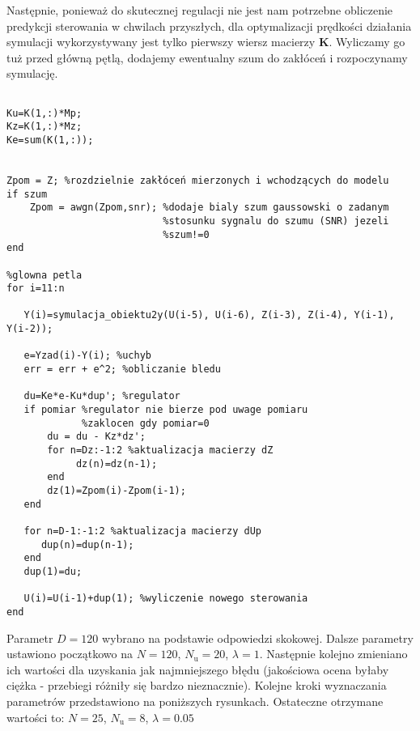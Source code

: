 Następnie, ponieważ do skutecznej regulacji nie jest nam potrzebne obliczenie predykcji sterowania w chwilach przyszłych, dla optymalizacji prędkości działania symulacji wykorzystywany jest tylko pierwszy wiersz macierzy $ \boldsymbol{K} $. Wyliczamy go tuż przed główną pętlą, dodajemy ewentualny szum do zakłóceń i rozpoczynamy symulację.


\begin{lstlisting}[style=Matlab-editor]
%przeksztalcanie wyliczonych macierzy do potrzebnych nam parametrow

Ku=K(1,:)*Mp;
Kz=K(1,:)*Mz;
Ke=sum(K(1,:));


Zpom = Z; %rozdzielnie zakłóceń mierzonych i wchodzących do modelu
if szum
    Zpom = awgn(Zpom,snr); %dodaje bialy szum gaussowski o zadanym
                           %stosunku sygnalu do szumu (SNR) jezeli 
                           %szum!=0
end

%glowna petla
for i=11:n

   Y(i)=symulacja_obiektu2y(U(i-5), U(i-6), Z(i-3), Z(i-4), Y(i-1), Y(i-2));

   e=Yzad(i)-Y(i); %uchyb
   err = err + e^2; %obliczanie bledu

   du=Ke*e-Ku*dup'; %regulator
   if pomiar %regulator nie bierze pod uwage pomiaru 
   			 %zaklocen gdy pomiar=0
       du = du - Kz*dz';
       for n=Dz:-1:2 %aktualizacja macierzy dZ
       		dz(n)=dz(n-1);
       end
       dz(1)=Zpom(i)-Zpom(i-1);
   end

   for n=D-1:-1:2 %aktualizacja macierzy dUp
      dup(n)=dup(n-1);
   end
   dup(1)=du;
   
   U(i)=U(i-1)+dup(1); %wyliczenie nowego sterowania
end
\end{lstlisting}

Parametr $ D = \num{120} $ wybrano na podstawie odpowiedzi skokowej. Dalsze parametry ustawiono początkowo na $ N = \num{120} $, $ N_\mathrm{u} = \num{20} $, $ \lambda = \num{1} $. Następnie kolejno zmieniano ich wartości dla uzyskania jak najmniejszego błędu (jakościowa ocena byłaby ciężka - przebiegi różniły się bardzo nieznacznie). Kolejne kroki wyznaczania parametrów przedstawiono na poniższych rysunkach. Ostateczne otrzymane wartości to: $ N = \num{25} $, $ N_\mathrm{u} = \num{8} $, $ \lambda = \num{0,05} $

